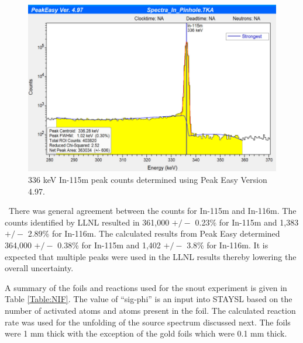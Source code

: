 \documentclass[journal]{IEEEtran}
\let\MYoriglatexcaption\caption
\renewcommand{\caption}[2][\relax]{\MYoriglatexcaption[#2]{#2}}
\begin{document}
\begin{figure}[h]
	\includegraphics[width=\linewidth]{Figures/PeakEZ.png}
	\caption{336 keV In-115m peak counts determined using Peak Easy Version 4.97.}
	\label{fig:peakez}
\end{figure}


\ There was general agreement between the counts for In-115m and In-116m. The counts identified by LLNL resulted in 361,000 $+/-$ 0.23\% for In-115m and 1,383 $+/-$ 2.89\% for In-116m. The calculated results from Peak Easy determined 364,000 $+/-$ 0.38\% for In-115m and 1,402 $+/-$ 3.8\% for In-116m. It is expected that multiple peaks were used in the LLNL results thereby lowering the overall uncertainty.

A summary of the foils and reactions used for the snout experiment is given in Table \ref{Table:NIF}. The value of ``sig-phi'' is an input into STAYSL based on the number of activated atoms and atoms present in the foil. The calculated reaction rate was used for the unfolding of the source spectrum discussed next. The foils were 1 mm thick with the exception of the gold foils which were 0.1 mm thick. 
\end{document}
